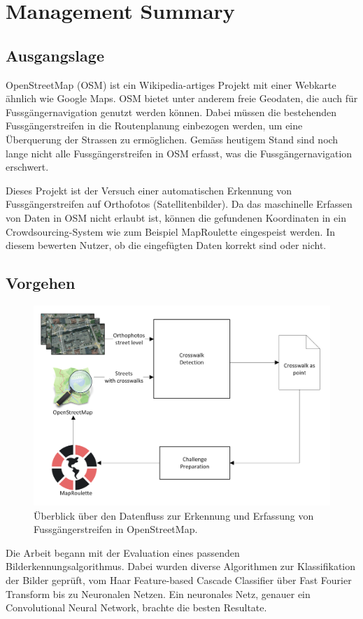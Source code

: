 \section{Management Summary}
\subsection*{Ausgangslage}
OpenStreetMap (OSM) ist ein Wikipedia-artiges Projekt mit einer Webkarte ähnlich wie Google Maps. OSM bietet unter anderem freie Geodaten, die auch für Fussgängernavigation genutzt werden können. Dabei müssen die bestehenden Fussgängerstreifen in die Routenplanung einbezogen werden, um eine Überquerung der Strassen zu ermöglichen. Gemäss heutigem Stand sind noch lange nicht alle Fussgängerstreifen in OSM erfasst, was die Fussgängernavigation erschwert.

Dieses Projekt ist der Versuch einer automatischen Erkennung von Fussgängerstreifen auf Orthofotos (Satellitenbilder). Da das maschinelle Erfassen von Daten in OSM nicht erlaubt ist, können die gefundenen Koordinaten in ein Crowdsourcing-System wie zum Beispiel MapRoulette eingespeist werden. In diesem bewerten Nutzer, ob die eingefügten Daten korrekt sind oder nicht.

\subsection*{Vorgehen}
\begin{figure}[H]
	\centering
	\includegraphics[width=410pt]{images/management_summary_1.png}
	\caption[Management Summery Überblick]{Überblick über den Datenfluss zur Erkennung und Erfassung von Fussgängerstreifen in OpenStreetMap.}
\end{figure}
\medskip
Die Arbeit begann mit der Evaluation eines passenden Bilderkennungsalgorithmus. Dabei wurden diverse Algorithmen zur Klassifikation der Bilder geprüft, vom Haar Feature-based Cascade Classifier über Fast Fourier Transform bis zu Neuronalen Netzen. Ein neuronales Netz, genauer ein Convolutional Neural Network, brachte die besten Resultate.

